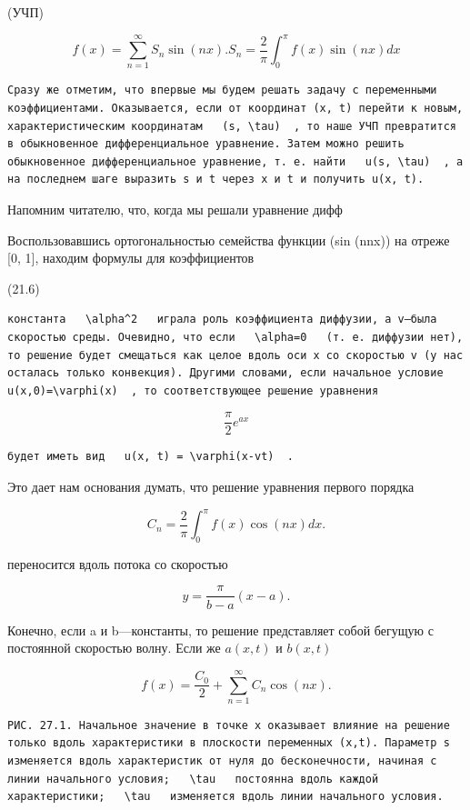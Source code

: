 \documentclass[
  ukrainian,
]{article}
\begin{document}
(УЧП)

\[
f(x) = \sum_{n=1}^{\infty} S_n \sin(nx).
S_n = \frac{2}{\pi} \int_{0}^{\pi} f(x) \sin(nx) dx
\]

\begin{verbatim}
Сразу же отметим, что впервые мы будем решать задачу с переменными коэффициентами. Оказывается, если от координат (x, t) перейти к новым, характеристическим координатам   (s, \tau)  , то наше УЧП превратится в обыкновенное дифференциальное уравнение. Затем можно решить обыкновенное дифференциальное уравнение, т. е. найти   u(s, \tau)  , а на последнем шаге выразить s и t через x и t и получить u(x, t).
\end{verbatim}

Напомним читателю, что, когда мы решали уравнение дифф

Воспользовавшись ортогональностью семейства функции (sin (nnx)) на
отреже {[}0, 1{]}, находим формулы для коэффициентов

(21.6)

\begin{verbatim}
константа   \alpha^2   играла роль коэффициента диффузии, а v—была скоростью среды. Очевидно, что если   \alpha=0   (т. е. диффузии нет), то решение будет смещаться как целое вдоль оси x со скоростью v (у нас осталась только конвекция). Другими словами, если начальное условие   u(x,0)=\varphi(x)  , то соответствующее решение уравнения
\end{verbatim}

\[
\frac{\pi}{2} e^{ax}
\]

\begin{verbatim}
будет иметь вид   u(x, t) = \varphi(x-vt)  .
\end{verbatim}

Это дает нам основания думать, что решение уравнения первого порядка

\[
C_n = \frac{2}{\pi} \int_0^{\pi} f(x) \cos(nx) dx.
\]

переносится вдоль потока со скоростью

\[
y = \frac{\pi}{b-a}(x-a).
\]

Конечно, если a и b---константы, то решение представляет собой бегущую с
постоянной скоростью волну. Если же \(a(x, t)\) и \(b(x, t)\)

\[
f(x) = \frac{C_0}{2} + \sum_{n=1}^{\infty} C_n \cos(nx).
\]

\begin{verbatim}
РИС. 27.1. Начальное значение в точке x оказывает влияние на решение только вдоль характеристики в плоскости переменных (x,t). Параметр s изменяется вдоль характеристик от нуля до бесконечности, начиная с линии начального условия;   \tau   постоянна вдоль каждой характеристики;   \tau   изменяется вдоль линии начального условия.
\end{verbatim}
\end{document}
